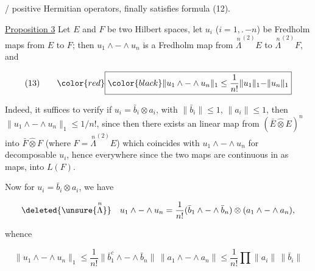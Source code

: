 / positive Hermitian operators, finally satisfies formula (12).


\uline{Proposition 3} Let $E$ and $F$ be two Hilbert spaces, let $u_i$ ($i=1,\mathord{.}\,\mathord{-}n$) be Fredholm maps from $E$ to $F$; then $u_1\wedge\mathord{-}\wedge u_n$ is a Fredholm map from $\overset{n}{\Lambda}^{(2)}E$ to $\overset{n}{\Lambda}^{(2)}F$, and
\reversemarginpar{}\normalmarginpar

\[
\begin{array}{@{}l@{\qquad}l@{}}
(13) & {\color{red}\boxed{\color{black}\displaystyle \lVert u_1\wedge\mathord{-}\wedge u_n\rVert_1\leq\frac1{n!}\lVert u_1\rVert_1\mathord{-}\lVert u_n\rVert_1}}
\end{array}
\]

Indeed, it suffices to \deleted{\unsure{$\leq$}} verify  if  $u_i=\bar b_i\otimes a_i$,  with $\lVert\bar b_i\rVert\leq1$, $\lVert a_i\rVert\leq1$, then $\lVert u_1\wedge\mathord{-}\wedge u_n\rVert_1\leq1/n!$,  since then there exists an  linear  map  from $(\bar E\widehat{\otimes}E)^n$ into  $\bar F\widehat{\otimes}F$ (where $F=\overset{n}{\Lambda}^{(2)}E$) which coincides with  $u_1\wedge\mathord{-}\wedge u_n$ for decomposable $u_i$, hence everywhere since the two maps are continuous  in  as maps, into $L(F)$.

Now for $u_i=\bar b_i\otimes a_i$, we have

\[
\deleted{\unsure{\overset{n}{\Lambda}}}\quad u_1\wedge\mathord{-}\wedge u_n=\frac1{n!}(\bar b_1\wedge\mathord{-}\wedge\bar b_n)\otimes(a_1\wedge\mathord{-}\wedge a_n),
\]

 whence

\[
\lVert u_1\wedge\mathord{-}\wedge u_n\rVert_1\leq\frac1{n!}\lVert\bar b_1^c\wedge\mathord{-}\wedge\bar b_n\rVert\,\lVert a_1\wedge\mathord{-}\wedge a_n\rVert\leq\frac1{n!}\prod\lVert a_i\rVert\,\lVert\bar b_i\rVert
\]

